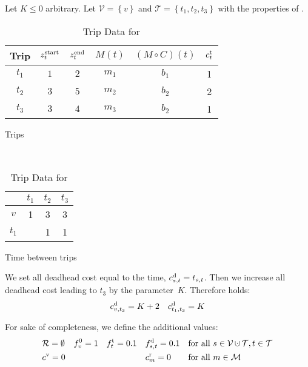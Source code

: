 \begin{example}
\label{ex:approximation_factor}

Let $K\leq 0$ arbitrary. Let ${\mathcal{V} = \left\{v\right\}}$ and ${\mathcal{T} = \left\{t_1,t_2,t_3\right\}}$ with the properties of . 

\begin{table}[htp]
	\centering
	\begin{subtable}[h]{.6\textwidth}
		\centering
		\begin{tabular}{c|ccccc}
			\toprule
			Trip & $z^{\operatorname{start}}_t$ & $z^{\operatorname{end}}_t$ & $M(t)$ & $\left(M\circ C\right)(t)$ & $c^{\operatorname{t}}_t$ \\
			\midrule%
			$t_1$ & $1$ & $2$ & $m_1$ & $b_1$ & 1 \\
			$t_2$ & $3$ & $5$ & $m_2$ & $b_2$ & 2 \\
			$t_3$ & $3$ & $4$ & $m_3$ & $b_2$ & 1 \\
			\bottomrule
		\end{tabular}
		\caption{Trips}
	\end{subtable}
	~
	\begin{subtable}[h]{.3\textwidth}
		\centering
		\begin{tabular}{c|ccc}
			\toprule
			& $t_1$ & $t_2$ & $t_3$ \\
			\midrule%
			$v$   & 1 & 3 & 3 \\
			$t_1$ &   & 1 & 1 \\
			\bottomrule
		\end{tabular}
		\caption{Time between trips}
	\end{subtable}
	\caption{Trip Data for }
	\label{tab:approximation_example}
\end{table}

We set all deadhead cost equal to the time, \ie ${c^{\operatorname{d}}_{s,t}=t_{s,t}}$. Then we increase all deadhead cost leading to $t_3$ by the parameter~$K$. Therefore holds:
\begin{align*}
	c^{\operatorname{d}}_{v,t_3} = K+2 && c^{\operatorname{d}}_{t_1,t_3} = K
\end{align*}

For sake of completeness, we define the additional values:
\begin{align*}
	& \mathcal{R}=\emptyset && f^0_v=1 && \ft_t=0.1 && \fd_{s,t}=0.1 && \text{for all } s\in\mathcal{V}\cupdot\mathcal{T}, t\in\mathcal{T} \\
	& \cv = 0 &&&&&& \croute_m=0 && \text{for all } m\in\mathcal{M} \\
\end{align*}


\end{example}
